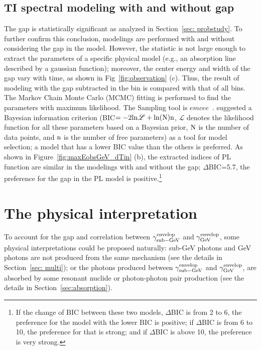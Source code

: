 \documentclass[linenumbers,twocolumn]{aastex631}
\begin{document}
\subsection{TI spectral modeling with and without gap}\label{sec: modeling}
 The gap is statistically significant as analyzed in Section~\ref{sec: probstudy}. To further confirm this conclusion, modelings are performed with and without considering the gap in the model. However, the statistic is not large enough to extract the parameters of a specific physical model (e.g., an absorption line described by a gaussian function); moreover, the center energy and width of the gap vary with time, as shown in Fig~\ref{fig:observation} (c). Thus, the result of modeling with the gap subtracted in the bin is compared with that of all bins.
The Markov Chain Monte Carlo (MCMC) fitting is performed to find the parameters with maximum likelihood. The Sampling tool is $emcee$~\citep{2013PASP..125..306F}. \cite{2016MNRAS.463.1144W} suggested a Bayesian information criterion (BIC$=-2\rm{ln} \mathscr{L} +\rm{ln} (N)n$, $\mathscr{L}$ denotes the likelihood
function for all these parameters based on a Bayesian prior, $\rm N$ is the number of data points, and $\rm n$ is the number of free parameters) as a tool for model selection; a model that has a lower BIC value than the others is preferred. 
As shown in Figure~\ref{fig:maxEobsGeV_dTin} (b), the extracted indices of PL function are similar in the modelings with and without the gap; $\Delta$BIC=5.7, the preference for the gap in the PL model is positive.\footnote{If the change of BIC between these two models, $\Delta$BIC is from 2 to 6, the preference for the model with the lower BIC is positive; if $\Delta$BIC is from 6 to 10, the preference for that is strong; and if $\Delta$BIC is above 10, the preference is very strong.}




  

\section{The physical interpretation}\label{sec:physical_interpretation}
To account for the gap and correlation between $\gamma^{\rm envelop}_{\rm sub-GeV}$ and $\gamma^{\rm envelop}_{\rm GeV}$, some physical interpretations could be proposed naturally: sub-GeV photons and GeV photons are not produced from the same mechanism (see the details in Section~\ref{sec: multi}); or the photons produced between $\gamma^{\rm envelop}_{\rm sub-GeV}$ and $\gamma^{\rm envelop}_{\rm GeV}$, are absorbed by some resonant nuclide or photon-photon pair production (see the details in Section~\ref{sec:absorption}). %
\end{document}
